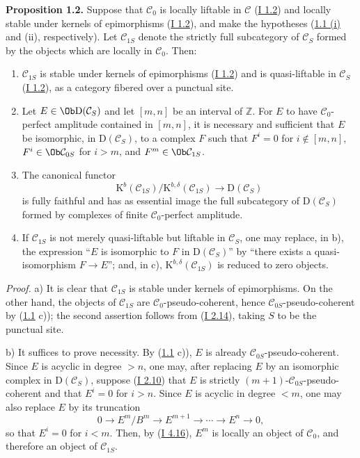 \textbf{Proposition 1.2.} Suppose that $\mathcal C_0$ is locally liftable in $\mathcal C$ (\hyperlink{sga6.e01.sec.1.2}{I 1.2}) and locally stable under kernels of epimorphisms (\hyperlink{sga6.e01.sec.1.2}{I 1.2}), and make the hypotheses (\hyperlink{sga6.e02.prop.1-1}{1.1 (i)} and (ii), respectively). Let $\mathcal C_{1S}$ denote the strictly full subcategory of $\mathcal C_S$ formed by the objects which are locally in $\mathcal C_0$. Then:
\begin{enumerate}[label=\alph*)]
\item $\mathcal C_{1S}$ is stable under kernels of epimorphisms (\hyperlink{sga6.e01.sec.1.2}{I 1.2}) and is quasi-liftable in $\mathcal C_S$ (\hyperlink{sga6.e01.sec.1.2}{I 1.2}), as a category fibered over a punctual site.
\item Let $E\in\Ob\mathrm D(\mathcal C_S)$ and let $[m,n]$ be an interval of $\mathbb Z$. For $E$ to have $\mathcal C_0$-perfect amplitude contained in $[m,n]$, it is necessary and sufficient that $E$ be isomorphic, in $\mathrm D(\mathcal C_S)$, to a complex $F$ such that $F^i=0$ for $i\notin[m,n]$, $F^i\in\Ob\mathcal C_{0S}$ for $i>m$, and $F^m\in\Ob\mathcal C_{1S}$.
\item The canonical functor
\[
\mathrm K^b(\mathcal C_{1S})/\mathrm K^{b,\delta}(\mathcal C_{1S})
\longrightarrow \mathrm D(\mathcal C_S)
\]
is fully faithful and has as essential image the full subcategory of $\mathrm D(\mathcal C_S)$ formed by complexes of finite $\mathcal C_0$-perfect amplitude.
\item If $\mathcal C_{1S}$ is not merely quasi-liftable but liftable in $\mathcal C_S$, one may replace, in b), the expression ``$E$ is isomorphic to $F$ in $\mathrm D(\mathcal C_S)$'' by ``there exists a quasi-isomorphism $F\to E$''; and, in c), $\mathrm K^{b,\delta}(\mathcal C_{1S})$ is reduced to zero objects.
\end{enumerate}

\emph{Proof.} a) It is clear that $\mathcal C_{1S}$ is stable under kernels of epimorphisms. On the other hand, the objects of $\mathcal C_{1S}$ are $\mathcal C_0$-pseudo-coherent, hence $\mathcal C_{0S}$-pseudo-coherent by (\hyperlink{sga6.e02.prop.1-1}{1.1} c)); the second assertion follows from (\hyperlink{sga6.e01.cor.2-14}{I 2.14}), taking $S$ to be the punctual site.

b) It suffices to prove necessity. By (\hyperlink{sga6.e02.prop.1-1}{1.1} c)), $E$ is already $\mathcal C_{0S}$-pseudo-coherent. Since $E$ is acyclic in degree $>n$, one may, after replacing $E$ by an isomorphic complex in $\mathrm D(\mathcal C_S)$, suppose (\hyperlink{sga6.e01.prop.2-10}{I 2.10}) that $E$ is strictly $(m+1)$-$\mathcal C_{0S}$-pseudo-coherent and that $E^i=0$ for $i>n$. Since $E$ is acyclic in degree $<m$, one may also replace $E$ by its truncation
\[
0\longrightarrow E^m/B^m\longrightarrow E^{m+1}\longrightarrow\cdots\longrightarrow E^n\longrightarrow0,
\]
so that $E^i=0$ for $i<m$. Then, by (\hyperlink{sga6.e01.lem.4-16}{I 4.16}), $E^m$ is locally an object of $\mathcal C_0$, and therefore an object of $\mathcal C_{1S}$.

